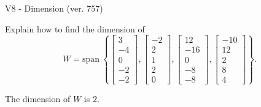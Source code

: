 \begin{exercise}
  \begin{exerciseTitle}V8 - Dimension (ver. 757)\end{exerciseTitle}
  \begin{exerciseStatement}
    Explain how to find the dimension of 
\[W=\mathrm{span}\ \left\{\left[\begin{array}{r}
3 \\
-4 \\
0 \\
-2 \\
-2
\end{array}\right] , \left[\begin{array}{r}
-2 \\
2 \\
1 \\
2 \\
0
\end{array}\right] , \left[\begin{array}{r}
12 \\
-16 \\
0 \\
-8 \\
-8
\end{array}\right] , \left[\begin{array}{r}
-10 \\
12 \\
2 \\
8 \\
4
\end{array}\right]\right\}.\]



  \end{exerciseStatement}
  \begin{exerciseAnswer}
   The dimension of \(W\) is  \(2\).
  


  \end{exerciseAnswer}
\end{exercise}